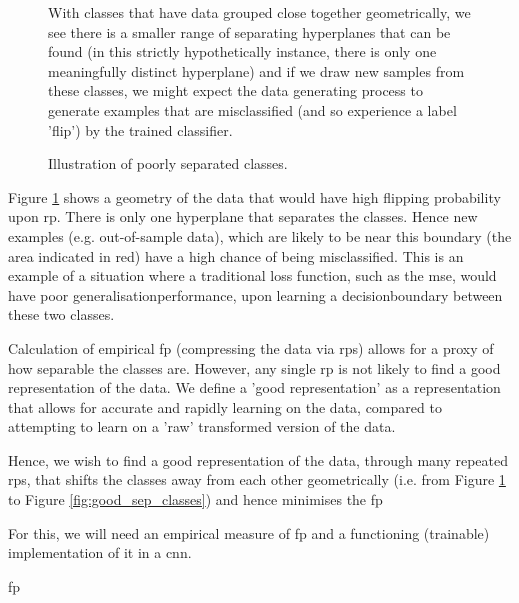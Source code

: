 \begin{figure}[H]
    \centering
    \caption{Illustration of poorly separated classes.}{With classes that have data grouped close together geometrically, we see there is a smaller range of separating hyperplanes that can be found (in this strictly hypothetically instance, there is only one meaningfully distinct hyperplane) and if we draw new samples from these classes, we might expect the data generating process to generate examples that are misclassified (and so experience a label 'flip') by the trained classifier.}
    \label{fig:poor_sep_classes}
\end{figure}

Figure \ref{fig:poor_sep_classes} shows a geometry of the data that would have high flipping probability upon \gls{rp}. There is only one \gls{hyperplane} that separates the classes. Hence new examples (e.g. out-of-sample data), which are likely to be near this boundary (the area indicated in red) have a high chance of being misclassified. This is an example of a situation where a traditional loss function, such as the \gls{mse}, would have poor \gls{generalisationperformance}, upon learning a \gls{decisionboundary} between these two classes. \bigskip

Calculation of empirical \gls{fp} (compressing the data via \gls{rp}s) allows for a proxy of how separable the classes are. However, any single \gls{rp} is not likely to find a good representation of the data. We define a 'good representation' as a representation that allows for accurate and rapidly learning on the data, compared to attempting to learn on a 'raw' transformed version of the data.


Hence, we wish to find a good representation of the data, through many repeated  \gls{rp}s, that shifts the classes away from each other geometrically (i.e. from Figure \ref{fig:poor_sep_classes} to Figure \ref{fig:good_sep_classes}) and hence minimises the \gls{fp} \bigskip

For this, we will need an empirical measure of \gls{fp} and a functioning (trainable) implementation of it in a \gls{cnn}. \bigskip

\gls{fp}